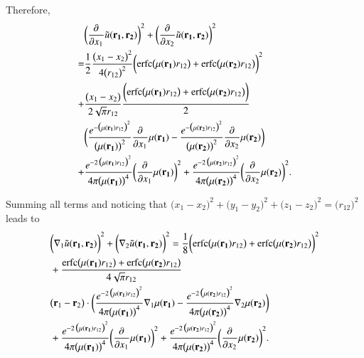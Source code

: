 \documentclass[aip,jcp,reprint,noshowkeys,superscriptaddress]{revtex4-1}
\newcommand{\deriv}[3]{\frac{\partial^{#3} #1}{\partial {#2}^{#3}}}
\newcommand{\bd}[1]{{\bf {#1}}}
\newcommand{\bri}[1]{{\bf r}_{#1}}
\newcommand{\mur}[1]{\mu({\bf r_{#1}})}
\begin{document}
Therefore, 
\begin{equation}
 \begin{aligned}
& \bigg(\deriv{}{x_1}{}\tilde{u}(\bd{r_1},\bd{r_2}) \bigg)^2 + \bigg(\deriv{}{x_2}{}\tilde{u}(\bd{r_1},\bd{r_2}) \bigg)^2  \\
 = & \frac{1}{2}\frac{\big( x_1 - x_2 \big)^2}{4 \big(r_{12}\big)^2} \bigg(\text{erfc}\big(\mur{1} r_{12}\big) + \text{erfc}\big(\mur{2} r_{12}\big) \bigg)^2  \\
 + & \frac{\big(x_1 - x_2\big)}{2 \sqrt{\pi}r_{12}}  \frac{\bigg(\text{erfc}\big(\mur{1} r_{12}\big) + \text{erfc}\big(\mur{2} r_{12}\big) \bigg)}{2} \\
&\bigg(   \frac{e^{-\big(\mur{1} r_{12}\big)^2}}{\big(\mur{1}\big)^2} \deriv{}{x_1}{}\mur{1} 
- \frac{e^{-\big(\mur{2} r_{12}\big)^2}}{\big(\mur{2}\big)^2} \deriv{}{x_2}{}\mur{2} \bigg) \\
 + & \frac{e^{-2 \,\big(\mur{1}r_{12} \big)^2}}{4\pi \big(\mur{1}\big)^4} \bigg( \deriv{}{x_1}{}\mur{1} \bigg)^2 
 + \frac{e^{-2 \,\big(\mur{2}r_{12} \big)^2}}{4\pi \big(\mur{2}\big)^4} \bigg( \deriv{}{x_2}{}\mur{2} \bigg)^2.
 \end{aligned}
\end{equation}

Summing all terms and noticing that $\bigg(x_1 - x_2\bigg)^2 + \bigg(y_1 - y_2\bigg)^2 + \bigg(z_1 - z_2\bigg)^2 = \bigg(r_{12}\bigg)^2$ leads to 
\begin{equation}
 \begin{aligned}
& \bigg(\nabla_1\tilde{u}(\bd{r_1},\bd{r_2})\bigg)^2 + \bigg(\nabla_2\tilde{u}(\bd{r_1},\bd{r_2})\bigg)^2 = 
  \frac{1}{8}\bigg(\text{erfc}\big(\mur{1} r_{12}\big) + \text{erfc}\big(\mur{2} r_{12}\big) \bigg)^2  \\
&+\frac{\text{erfc}\big(\mur{1} r_{12}\big) + \text{erfc}\big(\mur{2} r_{12}\big)}{4 \sqrt{\pi}r_{12}}  \\
& \big( \bri{1} - \bri{2}\big)\cdot
\bigg(\frac{e^{-2 \,\big(\mur{1}r_{12} \big)^2}}{4\pi \big(\mur{1}\big)^4} \nabla_1 \mur{1}
  -   \frac{e^{-2 \,\big(\mur{2}r_{12} \big)^2}}{4\pi \big(\mur{2}\big)^4} \nabla_2 \mur{2}  \bigg) \\
  &+ \frac{e^{-2 \,\big(\mur{1}r_{12} \big)^2}}{4\pi \big(\mur{1}\big)^4} \bigg( \deriv{}{x_1}{}\mur{1} \bigg)^2 
 + \frac{e^{-2 \,\big(\mur{2}r_{12} \big)^2}}{4\pi \big(\mur{2}\big)^4} \bigg( \deriv{}{x_2}{}\mur{2} \bigg)^2.
 \end{aligned}
\end{equation}

\end{document}
